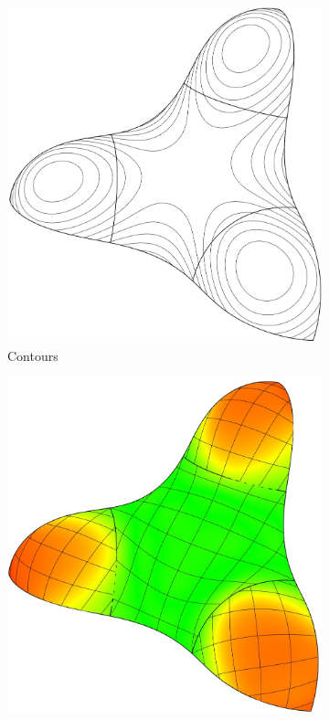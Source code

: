 \documentclass[9pt,academicons]{article}
\begin{document}
\begin{figure}
\begin{subfigure}{.24\textwidth}
    \includegraphics[height=.193\textheight]{images/trebol3-contour.jpg}
    \caption{Contours}
    \label{fig:trebol-contours}
  \end{subfigure}
  \hfill
  \begin{subfigure}{.24\textwidth}
    \centering
    \includegraphics[height=.2\textheight]{images/trebol3-mean-iso.jpg}

\end{subfigure}
\end{figure}
\end{document}
